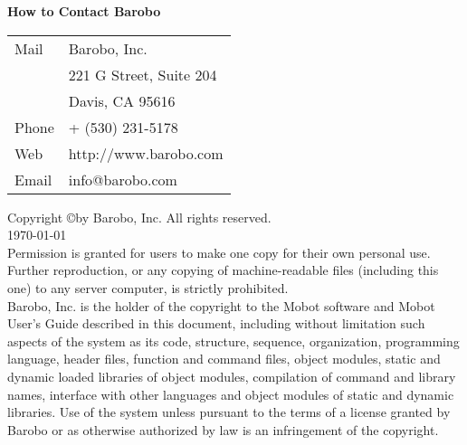 \newpage
\noindent
{\large\bf How to Contact Barobo}\\
\vspace*{-6pt}

\begin{tabular} {ll}
Mail & Barobo, Inc. \\
      &221 G Street, Suite 204\\
      &Davis, CA 95616\\
Phone & + (530) 231-5178\\
Web &http://www.barobo.com\\
Email &info@barobo.com 
\end{tabular}

\vspace{12pt}
\noindent
Copyright \copyright by Barobo, Inc.
All rights reserved. \\
\today\\

\noindent
Permission is granted for users to make
one copy for their own personal use. Further reproduction,
or any copying of machine-readable files (including this one)
to any server computer, is strictly prohibited.\\


\noindent
Barobo, Inc. 
is the holder of the copyright to the Mobot software
and Mobot User's Guide
described in this document, including without limitation
such aspects of the system as its code, structure,
sequence, organization, 
programming language, 
header files, 
function and command files,
object modules,
static and dynamic loaded libraries 
of object modules,
compilation of command and library names, 
interface with other languages and object modules
of static and dynamic libraries.
Use of the system unless pursuant to the terms
of a license granted by Barobo or as
otherwise authorized by law is an infringement
of the copyright.\\

